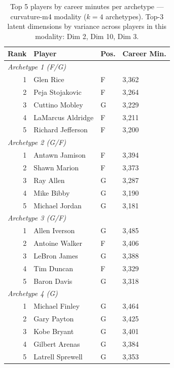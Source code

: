 \begin{table}[htbp]
  \centering\small
  \begin{tabular}{rlll}
    \toprule
    Rank & Player & Pos. & Career Min. \\
    \midrule
    \multicolumn{4}{l}{\textit{Archetype 1 (F/G)}} \\
    \midrule
    1 & Glen Rice & F & 3,362 \\
    2 & Peja Stojakovic & F & 3,264 \\
    3 & Cuttino Mobley & G & 3,229 \\
    4 & LaMarcus Aldridge & F & 3,211 \\
    5 & Richard Jefferson & F & 3,200 \\
    \midrule[0.4pt]
    \multicolumn{4}{l}{\textit{Archetype 2 (G/F)}} \\
    \midrule
    1 & Antawn Jamison & F & 3,394 \\
    2 & Shawn Marion & F & 3,373 \\
    3 & Ray Allen & G & 3,287 \\
    4 & Mike Bibby & G & 3,190 \\
    5 & Michael Jordan & G & 3,181 \\
    \midrule[0.4pt]
    \multicolumn{4}{l}{\textit{Archetype 3 (G/F)}} \\
    \midrule
    1 & Allen Iverson & G & 3,485 \\
    2 & Antoine Walker & F & 3,406 \\
    3 & LeBron James & G & 3,388 \\
    4 & Tim Duncan & F & 3,329 \\
    5 & Baron Davis & G & 3,318 \\
    \midrule[0.4pt]
    \multicolumn{4}{l}{\textit{Archetype 4 (G)}} \\
    \midrule
    1 & Michael Finley & G & 3,464 \\
    2 & Gary Payton & G & 3,425 \\
    3 & Kobe Bryant & G & 3,401 \\
    4 & Gilbert Arenas & G & 3,384 \\
    5 & Latrell Sprewell & G & 3,353 \\
    \bottomrule
  \end{tabular}
  \caption{Top 5 players by career minutes per archetype --- curvature-m4 modality ($k=4$ archetypes). Top-3 latent dimensions by variance across players in this modality: Dim 2, Dim 10, Dim 3.}
  \label{tab:arch_reps_curvature_m4}
\end{table}


